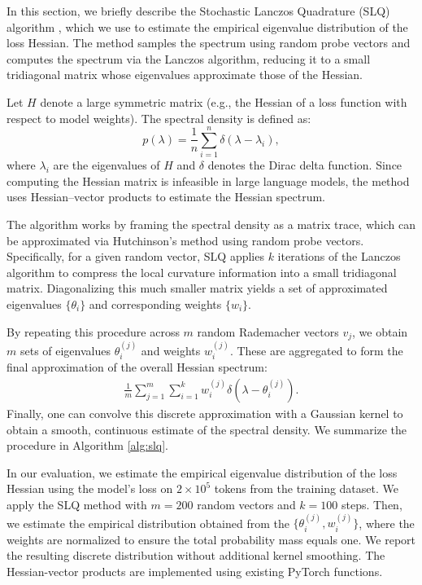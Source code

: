 \documentclass{article}
\theoremstyle{definition}
\begin{document}
In this section, we briefly describe the Stochastic Lanczos Quadrature (SLQ) algorithm \citep{bai1996some}, which we use to estimate the empirical eigenvalue distribution of the loss Hessian. 
The method samples the spectrum using random probe vectors and computes the spectrum via the Lanczos algorithm, reducing it to a small tridiagonal matrix whose eigenvalues approximate those of the Hessian.

Let $H$ denote a large symmetric matrix (e.g., the Hessian of a loss function with respect to model weights). The spectral density is defined as:
$$
p(\lambda) = \frac{1}{n} \sum_{i=1}^n \delta(\lambda - \lambda_i),
$$
where $\lambda_i$ are the eigenvalues of $H$ and $\delta$ denotes the Dirac delta function. Since computing the Hessian matrix is infeasible in large language models, the method uses Hessian–vector products to estimate the Hessian spectrum.



The algorithm works by framing the spectral density as a matrix trace, which can be approximated via Hutchinson’s method using random probe vectors. Specifically, for a given random vector, SLQ applies $k$ iterations of the Lanczos algorithm to compress the local curvature information into a small tridiagonal matrix. Diagonalizing this much smaller matrix yields a set of approximated eigenvalues $\{\theta_i\}$ and corresponding weights $\{w_i\}$.

By repeating this procedure across $m$ random Rademacher vectors $v_j$, we obtain $m$ sets of eigenvalues $\theta_{i}^{(j)}$ and weights $w_{i}^{(j)}$. These are aggregated to form the final approximation of the overall Hessian spectrum:
\begin{align}\label{eq_spectral_density}
\frac{1}{m} \sum_{j=1}^m \sum_{i=1}^k w_{i}^{(j)} \delta(\lambda - \theta_{i}^{(j)}).
\end{align}
Finally, one can convolve this discrete approximation with a Gaussian kernel to obtain a smooth, continuous estimate of the spectral density. We summarize the procedure in Algorithm \ref{alg:slq}.

In our evaluation, we estimate the empirical eigenvalue distribution of the loss Hessian using the model's loss on $2 \times 10^{5}$ tokens from the training dataset. We apply the SLQ method with $m = 200$ random vectors and $k=100$ steps. 
Then, we estimate the empirical distribution obtained from the $\{ \theta_{i}^{(j)}, w_{i}^{(j)} \}$, where the weights are normalized to ensure the total probability mass equals one. We report the resulting discrete distribution without additional kernel smoothing.
The Hessian-vector products are implemented using existing PyTorch functions.
\end{document}
